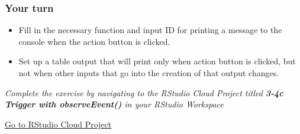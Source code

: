 \documentclass[
  letterpaper,
  DIV=11,
  numbers=noendperiod]{scrreprt}
\providecommand{\tightlist}{%
  \setlength{\itemsep}{0pt}\setlength{\parskip}{0pt}}
\begin{document}
\hypertarget{your-turn-26}{%
\subsubsection{Your turn}\label{your-turn-26}}

\begin{itemize}
\tightlist
\item
  Fill in the necessary function and input ID for printing a message to
  the console when the action button is clicked.
\item
  Set up a table output that will print only when action button is
  clicked, but not when other inputs that go into the creation of that
  output changes.
\end{itemize}

\emph{Complete the exercise by navigating to the RStudio Cloud Project
titled \textbf{3-4c Trigger with observeEvent()} in your RStudio
Workspace}

\href{https://rstudio.cloud/spaces/81721/join?access_code=I4VJaNsKfTqR3Td9hLP7E1nz8\%2FtMg6Xbw9Bgqumv}{
Go to RStudio Cloud Project}
\end{document}
